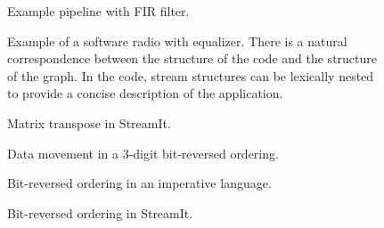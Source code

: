 \begin{figure}[t]
\centering
{}
\hspace{0.15in}
\caption{Example pipeline with FIR filter.\protect\label{fig:pipeline}}
\end{figure}

\begin{figure}[t]
\centering
{}
\caption[Example of a software radio with equalizer]{Example of a
  software radio with equalizer.  There is a natural correspondence
  between the structure of the code and the structure of the graph.
  In the code, stream structures can be lexically nested to provide a
  concise description of the application.\protect\label{fig:fm-radio}}
\end{figure}

\begin{figure}[t]
\centering
{}
\caption{Matrix transpose in StreamIt.\protect\label{fig:transpose}}
\end{figure}

\begin{figure}[t]
\centering
\begin{minipage}{2.5in}
\centering
{}
\end{minipage}
\hspace{0.5in}
\begin{minipage}{3in}
\centering
{}
\end{minipage}

\begin{minipage}{2.5in}
\caption{Data movement in a 3-digit bit-reversed ordering.\protect\label{fig:bitreverse-pattern}}
\end{minipage}
\hspace{0.5in}
\begin{minipage}{3in}
\centering
\caption{Bit-reversed ordering in an imperative language.\protect\label{fig:bitreverse-c}}
\end{minipage}

\end{figure}

\begin{figure}[t]
\centering
{}
\caption{Bit-reversed ordering in StreamIt.\protect\label{fig:bitreverse-streamit}}
\end{figure}

